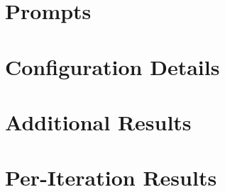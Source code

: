 \documentclass[11pt,a4paper]{report}
\begin{document}
\chapter{Prompts}


\chapter{Configuration Details}


\chapter{Additional Results}


\chapter{Per-Iteration Results}

\end{document}
